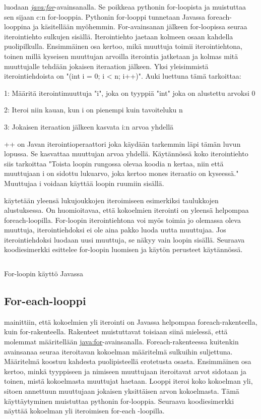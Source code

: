 \documentclass{tufte-book}
\newcommand{\java}[1]{\underline{\gls{java:#1}}}
\newcommand{\newjava}[1]{\textit{\java{#1}}}
\newcommand{\code}[3]{
\begin{listing}
    \inputminted{java}{OhjelmointiopasEsimerkit/src/#1/#2.java}
    \caption{#3}
    \label{Java-#1-#2}
\end{listing}
}
\begin{document}
 luodaan \newjava{for}-avainsanalla. Se poikkeaa pythonin for-loopista
ja muistuttaa sen sijaan c:n for-looppia. Pythonin for-looppi tunnetaan Javassa foreach-looppina
ja käsitellään myöhemmin. For-avainsanan jälkeen for-loopissa seuraa iterointiehto sulkujen
sisällä. Iterointiehto jaetaan kolmeen osaan kahdella puolipilkulla. Ensimmäinen osa kertoo,
mikä muuttuja toimii iterointiehtona, toinen millä kyseisen muuttujan arvoilla iterointia
jatketaan ja kolmas mitä muuttujalle tehdään jokaisen iteraation jälkeen. Yksi yleisimmistä
iterointiehdoista on "(int i = 0; i < n; i++)". Auki luettuna tämä tarkoittaa:

1: Määritä iterointimuuttuja "i", joka on tyyppiä "int" joka on alustettu arvoksi 0

2: Iteroi niin kauan, kun i on pienempi kuin tavoiteluku n

3: Jokaisen iteraation jälkeen kasvata i:n arvoa yhdellä

++ on Javan iterointioperaattori joka käydään tarkemmin läpi tämän luvun lopussa. Se kasvattaa
muuttujan arvoa yhdellä. Käytännössä koko iterointiehto siis tarkoittaa "Toista loopin rungossa
olevaa koodia n kertaa, niin että muuttujaan i on sidottu lukuarvo, joka kertoo mones iteraatio
on kyseessä." Muuttujaa i voidaan käyttää loopin ruumiin sisällä. 

 käytetään yleensä lukujoukkojen iteroimiseen esimerkiksi taulukkojen
alustuksessa. On huomioitavaa, että kokoelmien iterointi on yleensä helpompaa foreach-loopilla.
For-loopin iterointiehtona voi myös toimia jo olemassa oleva muuttuja, iterointiehdoksi ei ole
aina pakko luoda uutta muuttujaa. Jos iterointiehdoksi luodaan uusi muuttuja, se näkyy vain
loopin sisällä. Seuraava koodiesimerkki esittelee for-loopin luomisen ja käytön perusteet käytännössä.

\code{week3}{BasicForLoop}{For-loopin käyttö Javassa}

\subsection{For-each-looppi}
\label{for each}

 mainittiin, että kokoelmien yli iterointi on Javassa
helpompaa foreach-rakenteella, kuin for-rakenteella. Rakenteet muistuttavat toisiaan siinä
mielessä, että molemmat määritellään \java{for}-avainsanalla. Foreach-rakenteessa kuitenkin
avainsanaa seuraa iteroitavan kokoelman määritelmä sulkuihin suljettuna. Määritelmä koostuu
kahdesta puolipisteellä erotetusta osasta. Ensimmäinen osa kertoo, minkä tyyppiseen ja nimiseen
muuttujaan iteroitavat arvot sidotaan ja toinen, mistä kokoelmasta muuttujat haetaan. Looppi
iteroi koko kokoelman yli, sitoen annettuun muuttujaan jokaisen yksittäisen arvon kokoelmasta.
Tämä käyttäytyminen muistuttaa pythonin for-looppia. Seuraava koodiesimerkki näyttää kokoelman
yli iteroimisen for-each -loopilla.
\end{document}
